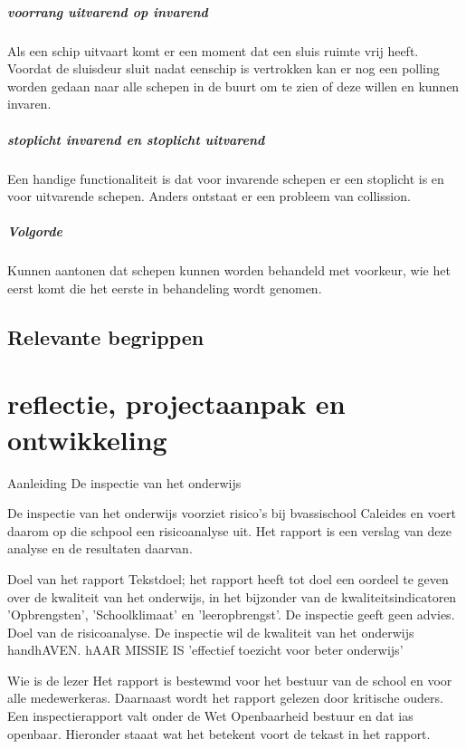 \documentclass[11pt]{report} %
\begin{document}
\subsubsection{voorrang uitvarend op invarend}
Als een schip uitvaart komt er een moment dat een sluis ruimte vrij heeft. Voordat de sluisdeur sluit nadat eenschip is vertrokken kan er nog een polling worden gedaan naar alle schepen in de buurt om te zien of deze willen en kunnen invaren.

\subsubsection{stoplicht invarend en stoplicht uitvarend}
Een handige functionaliteit is dat voor invarende schepen er een stoplicht is en voor uitvarende schepen. Anders ontstaat er een probleem van collission. 

\subsubsection{Volgorde}
Kunnen aantonen dat schepen kunnen worden behandeld met voorkeur, wie het eerst komt die het eerste in behandeling wordt genomen.

\chapter{Relevante begrippen}


 

\part{reflectie, projectaanpak en ontwikkeling}


Aanleiding
De inspectie van het onderwijs

De inspectie van het onderwijs voorziet risico's bij bvassischool Caleides en voert daarom op die schpool een risicoanalyse uit. Het rapport is een verslag van deze analyse en de resultaten daarvan.

Doel van het rapport
Tekstdoel; het rapport heeft tot doel een oordeel te geven over de kwaliteit van het onderwijs, in het bijzonder van de kwaliteitsindicatoren 'Opbrengsten', 'Schoolklimaat' en 'leeropbrengst'. De inspectie geeft geen advies.
Doel van de risicoanalyse. De inspectie wil de kwaliteit  van het onderwijs handhAVEN. hAAR MISSIE IS 'effectief toezicht  voor beter onderwijs'


Wie is de lezer
Het rapport is bestewmd voor het bestuur van de school en voor alle medewerkeras. Daarnaast wordt het rapport gelezen door kritische ouders. Een inspectierapport valt onder de Wet Openbaarheid bestuur en dat ias openbaar. Hieronder staaat wat het betekent voort de tekast in het rapport.
\end{document}

